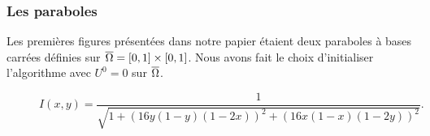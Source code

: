 \subsubsection{Les paraboles}
Les premières figures présentées dans notre papier étaient deux paraboles à bases carrées définies sur  $\overline{\Omega} = \mathopen{}\left[0,1\right]\mathclose{}\times \mathopen{}\left[0,1\right]\mathclose{}$. Nous avons fait le choix d'initialiser l'algorithme avec $U^0 = 0$ sur $\overline{\Omega}$.
\vspace{1em}
\begin{figure}[!htb]
    \centering

    \vspace{0.5em}

    \centering
    \[
        I(x, y) = \frac{1}{
            \sqrt{1 + \left(16y(1 - y)(1 - 2x)\right)^2 + \left(16x(1 - x)(1 - 2y)\right)^2}
        }.
    \]
    \label{Fig:int_parabole}
\end{figure}
